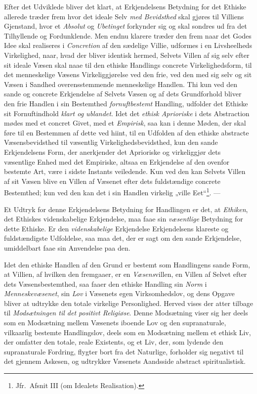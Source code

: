 Efter det Udviklede bliver det klart, at Erkjendelsens Betydning for det Ethiske
allerede træder frem hvor det ideale Selv \emph{med Bevidsthed} skal gjøres til
Villiens Gjenstand, hvor et \emph{Absolut} og \emph{Ubetinget} forkynder sig og
skal sondres ud fra det Tilhyllende og Fordunklende. Men endnu klarere træder
den frem naar det Godes Idee skal realiseres i \emph{Concretion} af den sædelige
Villie, udformes i en Livsheelheds Virkelighed, naar, hvad der bliver identisk
hermed, Selvets Villen af sig selv efter sit ideale Væsen skal naae til den
ethiske Handlings concrete Virkelighedsform, til det menneskelige Væsens
Virkeliggjørelse ved den frie, ved den med sig selv og sit Væsen i Sandhed
overensstemmende menneskelige Handlen. Thi kun ved den sande og concrete
Erkjendelse af Selvets Væsen og af dets Grundforhold bliver den frie Handlen i
sin Bestemthed \emph{fornuftbestemt} Handling, udfolder det Ethiske sit
Fornuftindhold \emph{klart og ublandet}. Idet det \emph{ethisk Aprioriske} i
dets Abstraction mødes med et concret Givet, med et \emph{Empirisk}, saa kan i
denne Møden, der skal føre til en Bestemmen af dette ved hiint, til en Udfolden
af den ethiske abstracte Væsensbevidsthed til væsentlig
Virkelighedsbevidsthed, kun den sande Erkjendelsens Form, der anerkjender det
 \setcounter{footnote}{0}%
Aprioriske og virkeliggjør dets væsentlige Enhed med det Empiriske, altsaa en
Erkjendelse af den ovenfor bestemte Art, være i sidste Instants veiledende. Kun
ved den kan Selvets Villen af sit Væsen blive en Villen af Væsenet efter dets
fuldstændige concrete Bestemthed; kun ved den kan det i sin Handlen virkelig
„ville Eet“\footnote{Jfr.\ Afsnit III (om Idealets Realisation).}. ---

Et Udtryk for denne Erkjendelsens Betydning for Handlingen er det, at
\emph{Ethiken}, det Ethiskes videnskabelige Erkjendelse, maa faae sin
\emph{væsentlige} Betydning for dette Ethiske. Er den \emph{videnskabelige}
Erkjendelse Erkjendelsens klareste og fuldstændigste Udfoldelse, saa maa det,
der er sagt om den sande Erkjendelse, umiddelbart faae sin Anvendelse paa den.

Idet den ethiske Handlen af den Grund er bestemt som Handlingens sande Form, at
Villien, af hvilken den fremgaaer, er en \emph{Væsens}villen, en Villen af
Selvet efter dets Væsensbestemthed, saa faaer den ethiske Handling sin
\emph{Norm} i \emph{Menneskevæsenet}, sin \emph{Lov} i Væsenets egen
Virksomhedslov, og dens Opgave bliver at udtrykke den totale virkelige
Personlighed.
Herved vises der atter tilbage til \emph{Modsætningen til det positivt
Religiøse}. Denne Modsætning viser sig her deels som en Modsætning mellem
Væsenets iboende Lov og den supranaturale, vilkaarlig bestemte Handlingslov,
deels som en Modsætning mellem et ethisk Liv, der omfatter den totale, reale
Existents, og et Liv, der, som lydende den supranaturale Fordring, flygter bort
fra det Naturlige, forholder sig negativt til det gjennem Askesen, og udtrykker
Væsenets Aandsside abstract spiritualistisk.

